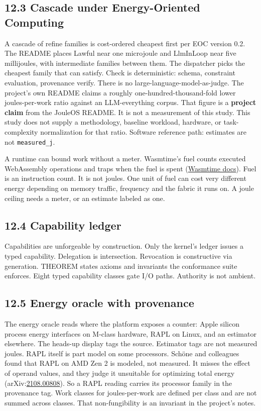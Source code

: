 \documentclass[10pt,letterpaper]{article}
\begin{document}
\subsection{12.3 Cascade under Energy-Oriented
Computing}\label{cascade-under-energy-oriented-computing}

A cascade of refine families is cost-ordered cheapest first per EOC
version 0.2. The README places Lawful near one microjoule and LlmInLoop
near five millijoules, with intermediate families between them. The
dispatcher picks the cheapest family that can satisfy. Check is
deterministic: schema, constraint evaluation, provenance verify. There
is no large-language-model-as-judge. The project's own README claims a
roughly one-hundred-thousand-fold lower joules-per-work ratio against an
LLM-everything corpus. That figure is a \textbf{project claim} from the
JouleOS README. It is not a measurement of this study. This study does
not supply a methodology, baseline workload, hardware, or
task-complexity normalization for that ratio. Software reference path:
estimates are not \texttt{measured\_j}.

A runtime can bound work without a meter. Wasmtime's fuel counts
executed WebAssembly operations and traps when the fuel is spent
(\href{https://docs.wasmtime.dev/examples-interrupting-wasm.html}{Wasmtime
docs}). Fuel is an instruction count. It is not joules. One unit of fuel
can cost very different energy depending on memory traffic, frequency
and the fabric it runs on. A joule ceiling needs a meter, or an estimate
labeled as one.

\subsection{12.4 Capability ledger}\label{capability-ledger}

Capabilities are unforgeable by construction. Only the kernel's ledger
issues a typed capability. Delegation is intersection. Revocation is
constructive via generation. THEOREM states axioms and invariants the
conformance suite enforces. Eight typed capability classes gate I/O
paths. Authority is not ambient.

\subsection{12.5 Energy oracle with
provenance}\label{energy-oracle-with-provenance}

The energy oracle reads where the platform exposes a counter: Apple
silicon process energy interfaces on M-class hardware, RAPL on Linux,
and an estimator elsewhere. The heads-up display tags the source.
Estimator tags are not measured joules. RAPL itself is part model on
some processors. Schöne and colleagues found that RAPL on AMD Zen 2 is
modeled, not measured. It misses the effect of operand values, and they
judge it unsuitable for optimizing total energy
(arXiv:\href{https://arxiv.org/abs/2108.00808}{2108.00808}). So a RAPL
reading carries its processor family in the provenance tag. Work classes
for joules-per-work are defined per class and are not summed across
classes. That non-fungibility is an invariant in the project's notes.
\end{document}
